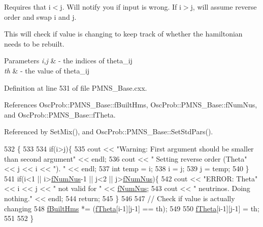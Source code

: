 Requires that i$<$j. Will notify you if input is wrong. If i$>$j, will assume reverse order and swap i and j.

This will check if value is changing to keep track of whether the hamiltonian needs to be rebuilt.


\begin{DoxyParams}{Parameters}
{\em i,j} & -\/ the indices of theta\+\_\+ij \\
\hline
{\em th} & -\/ the value of theta\+\_\+ij \\
\hline
\end{DoxyParams}


Definition at line 531 of file P\+M\+N\+S\+\_\+\+Base.\+cxx.



References Osc\+Prob\+::\+P\+M\+N\+S\+\_\+\+Base\+::f\+Built\+Hms, Osc\+Prob\+::\+P\+M\+N\+S\+\_\+\+Base\+::f\+Num\+Nus, and Osc\+Prob\+::\+P\+M\+N\+S\+\_\+\+Base\+::f\+Theta.



Referenced by Set\+Mix(), and Osc\+Prob\+::\+P\+M\+N\+S\+\_\+\+Base\+::\+Set\+Std\+Pars().


\begin{DoxyCode}
532 \{
533 
534   \textcolor{keywordflow}{if}(i>j)\{
535     cout << \textcolor{stringliteral}{"Warning: First argument should be smaller than second argument"} << endl;
536     cout << \textcolor{stringliteral}{"         Setting reverse order (Theta"} << j << i << \textcolor{stringliteral}{"). "} << endl;
537     \textcolor{keywordtype}{int} temp = i;
538     i = j;
539     j = temp;
540   \}
541   \textcolor{keywordflow}{if}(i<1 || i>\hyperlink{classOscProb_1_1PMNS__Base_a24bb74bed63569dfe88b18fa6a08060e}{fNumNus}-1 || j<2 || j>\hyperlink{classOscProb_1_1PMNS__Base_a24bb74bed63569dfe88b18fa6a08060e}{fNumNus})\{
542     cout << \textcolor{stringliteral}{"ERROR: Theta"} << i << j << \textcolor{stringliteral}{" not valid for "} << \hyperlink{classOscProb_1_1PMNS__Base_a24bb74bed63569dfe88b18fa6a08060e}{fNumNus};
543     cout << \textcolor{stringliteral}{" neutrinos. Doing nothing."} << endl;
544     \textcolor{keywordflow}{return};
545   \}
546 
547   \textcolor{comment}{// Check if value is actually changing}
548   \hyperlink{classOscProb_1_1PMNS__Base_a9ac3cadeac8db1b90f3152f476244780}{fBuiltHms} *= (\hyperlink{classOscProb_1_1PMNS__Base_a1976887cd658dd86b2336c181f1470b4}{fTheta}[i-1][j-1] == th);
549 
550   \hyperlink{classOscProb_1_1PMNS__Base_a1976887cd658dd86b2336c181f1470b4}{fTheta}[i-1][j-1] = th;
551 
552 \}
\end{DoxyCode}

